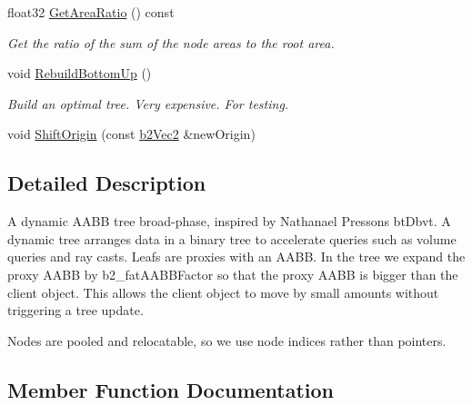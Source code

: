 \begin{DoxyCompactItemize}
\item 
\mbox{\label{classb2_dynamic_tree_a87da9819c4f190faec38f7fe4608caae}} 
float32 \hyperlink{classb2_dynamic_tree_a87da9819c4f190faec38f7fe4608caae}{Get\+Area\+Ratio} () const
\begin{DoxyCompactList}\small\item\em Get the ratio of the sum of the node areas to the root area. \end{DoxyCompactList}\item 
\mbox{\label{classb2_dynamic_tree_abd146017cfec1cf5ea7b87331f30a3ff}} 
void \hyperlink{classb2_dynamic_tree_abd146017cfec1cf5ea7b87331f30a3ff}{Rebuild\+Bottom\+Up} ()
\begin{DoxyCompactList}\small\item\em Build an optimal tree. Very expensive. For testing. \end{DoxyCompactList}\item 
void \hyperlink{classb2_dynamic_tree_af37ddfed6a5da97d5a78b09918d19ceb}{Shift\+Origin} (const \hyperlink{structb2_vec2}{b2\+Vec2} \&new\+Origin)
\end{DoxyCompactItemize}


\subsection{Detailed Description}
A dynamic A\+A\+BB tree broad-\/phase, inspired by Nathanael Presson\textquotesingle{}s bt\+Dbvt. A dynamic tree arranges data in a binary tree to accelerate queries such as volume queries and ray casts. Leafs are proxies with an A\+A\+BB. In the tree we expand the proxy A\+A\+BB by b2\+\_\+fat\+A\+A\+B\+B\+Factor so that the proxy A\+A\+BB is bigger than the client object. This allows the client object to move by small amounts without triggering a tree update.

Nodes are pooled and relocatable, so we use node indices rather than pointers. 

\subsection{Member Function Documentation}
\mbox{\label{classb2_dynamic_tree_ae3c7dc771d596f1f95fd3a3d7f2f3e97}} 
